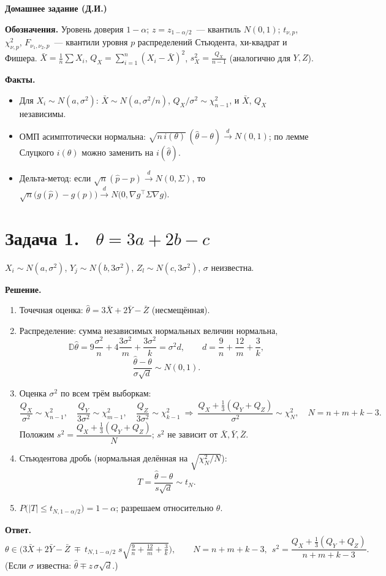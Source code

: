 \documentclass[12pt,a4paper]{article}
\newcommand{\D}{\mathbb{D}}
\newcommand{\sol}{\par\noindent\textbf{Решение.} }
\newcommand{\ans}{\par\smallskip\noindent\textbf{Ответ.} }
\begin{document}
\begin{center}
  \Large\textbf{Домашнее задание (Д.И.)}
\end{center}

\noindent\textbf{Обозначения.} Уровень доверия $1-\alpha$;
$z=z_{1-\alpha/2}$~--- квантиль $N(0,1)$;
$t_{\nu,p}$, $\chi^2_{\nu,p}$, $F_{\nu_1,\nu_2,p}$~--- квантили уровня $p$
распределений Стьюдента, хи-квадрат и Фишера.
$\bar X=\frac1n\sum X_i$, $Q_X=\sum_{i=1}^n(X_i-\bar X)^2$,
$s_X^2=\frac{Q_X}{n-1}$ (аналогично для $Y,Z$).

\smallskip
\noindent\textbf{Факты.}
\begin{itemize}
  \item Для $X_i\sim N(a,\sigma^2)$: $\bar X\sim N(a,\sigma^2/n)$,
        $Q_X/\sigma^2\sim\chi^2_{n-1}$, и $\bar X$, $Q_X$ независимы.
  \item ОМП асимптотически нормальна:
        $\sqrt{n\,i(\theta)}\,(\hat\theta-\theta)\xrightarrow{d}N(0,1)$;
        по лемме Слуцкого $i(\theta)$ можно заменить на $i(\hat\theta)$.
  \item Дельта-метод: если $\sqrt n(\hat p-p)\xrightarrow{d}N(0,\Sigma)$,
        то $\sqrt n\big(g(\hat p)-g(p)\big)\xrightarrow{d}
        N\big(0,\nabla g^\top\Sigma\nabla g\big)$.
\end{itemize}

\section*{Задача 1. \ $\theta=3a+2b-c$}
$X_i\sim N(a,\sigma^2)$, $Y_j\sim N(b,3\sigma^2)$, $Z_l\sim N(c,3\sigma^2)$,
$\sigma$ неизвестна.

\sol
\begin{enumerate}
  \item Точечная оценка: $\hat\theta=3\bar X+2\bar Y-\bar Z$ (несмещённая).
  \item Распределение: сумма независимых нормальных величин нормальна,
  \[
    \D\hat\theta=9\frac{\sigma^2}{n}+4\frac{3\sigma^2}{m}+\frac{3\sigma^2}{k}
    =\sigma^2 d,\qquad d=\frac9n+\frac{12}m+\frac3k,
  \]
  \[
    \frac{\hat\theta-\theta}{\sigma\sqrt d}\sim N(0,1).
  \]
  \item Оценка $\sigma^2$ по всем трём выборкам:
  \[
    \frac{Q_X}{\sigma^2}\sim\chi^2_{n-1},\quad
    \frac{Q_Y}{3\sigma^2}\sim\chi^2_{m-1},\quad
    \frac{Q_Z}{3\sigma^2}\sim\chi^2_{k-1}
    \ \Rightarrow\
    \frac{Q_X+\frac13(Q_Y+Q_Z)}{\sigma^2}\sim\chi^2_{N},\quad N=n+m+k-3.
  \]
  Положим $s^2=\dfrac{Q_X+\frac13(Q_Y+Q_Z)}{N}$; $s^2$ не зависит от
  $\bar X,\bar Y,\bar Z$.
  \item Стьюдентова дробь (нормальная делённая на $\sqrt{\chi^2_N/N}$):
  \[
    T=\frac{\hat\theta-\theta}{s\sqrt d}\sim t_N.
  \]
  \item $P\big(|T|\le t_{N,1-\alpha/2}\big)=1-\alpha$; разрешаем относительно $\theta$.
\end{enumerate}
\ans
\[
  \theta\in\Big(3\bar X+2\bar Y-\bar Z\ \mp\ t_{N,1-\alpha/2}\; s\sqrt{\tfrac9n+\tfrac{12}m+\tfrac3k}\Big),
  \qquad N=n+m+k-3,\ \ s^2=\frac{Q_X+\frac13(Q_Y+Q_Z)}{n+m+k-3}.
\]
(Если $\sigma$ известна: $\hat\theta\mp z\,\sigma\sqrt d$.)
\end{document}

